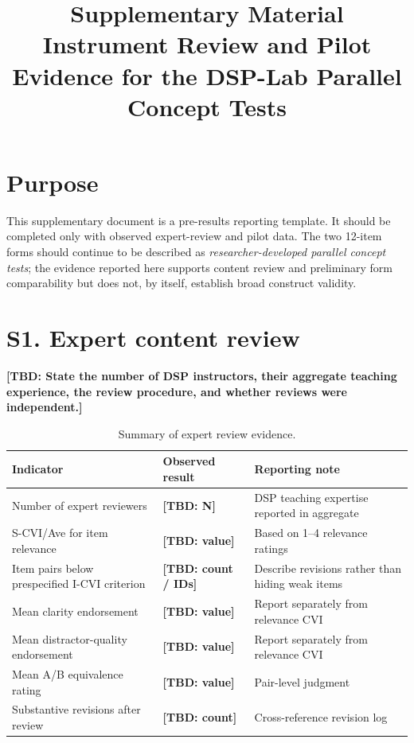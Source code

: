 \documentclass[10pt,a4paper]{article}
\title{Supplementary Material\\Instrument Review and Pilot Evidence for the DSP-Lab Parallel Concept Tests}
\author{}
\date{}
\newcommand{\tbd}[1]{\textbf{[TBD: #1]}}
\begin{document}
\maketitle

\section*{Purpose}
This supplementary document is a pre-results reporting template. It should be completed only with observed expert-review and pilot data. The two 12-item forms should continue to be described as \emph{researcher-developed parallel concept tests}; the evidence reported here supports content review and preliminary form comparability but does not, by itself, establish broad construct validity.

\section*{S1. Expert content review}
\tbd{State the number of DSP instructors, their aggregate teaching experience, the review procedure, and whether reviews were independent.}

\begin{table}[htbp]
\centering
\caption{Summary of expert review evidence.}
\label{tab:s1-expert-summary}
\begin{tabular}{L{0.43\textwidth} C{0.20\textwidth} L{0.27\textwidth}}
\toprule
Indicator & Observed result & Reporting note \\
\midrule
Number of expert reviewers & \tbd{N} & DSP teaching expertise reported in aggregate \\
S-CVI/Ave for item relevance & \tbd{value} & Based on 1--4 relevance ratings \\
Item pairs below prespecified I-CVI criterion & \tbd{count / IDs} & Describe revisions rather than hiding weak items \\
Mean clarity endorsement & \tbd{value} & Report separately from relevance CVI \\
Mean distractor-quality endorsement & \tbd{value} & Report separately from relevance CVI \\
Mean A/B equivalence rating & \tbd{value} & Pair-level judgment \\
Substantive revisions after review & \tbd{count} & Cross-reference revision log \\
\bottomrule
\end{tabular}
\end{table}
\end{document}
